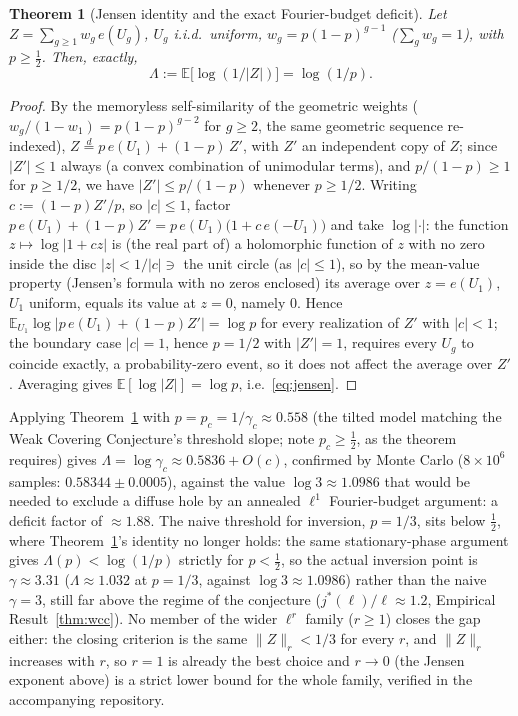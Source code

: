 \documentclass[11pt]{article}
\newtheorem{theorem}{Theorem}[section]
\theoremstyle{definition}
\theoremstyle{remark}
\begin{document}
\begin{theorem}[Jensen identity and the exact Fourier-budget deficit]
\label{thm:jensen}
Let $Z=\sum_{g\ge1} w_g\, e(U_g)$, $U_g$ i.i.d.\ uniform, $w_g =
p(1-p)^{g-1}$ ($\sum_g w_g=1$), with $p\ge\tfrac12$. Then, exactly,
\begin{equation}\label{eq:jensen}
  \Lambda := \mathbb{E}\bigl[\log(1/|Z|)\bigr] = \log(1/p).
\end{equation}
\end{theorem}

\begin{proof}
By the memoryless self-similarity of the geometric weights
($w_g/(1-w_1)=p(1-p)^{g-2}$ for $g\ge2$, the same geometric sequence
re-indexed), $Z \overset{d}{=} p\, e(U_1) + (1-p)\, Z'$, with $Z'$ an
independent copy of $Z$; since $|Z'|\le 1$ always (a convex combination
of unimodular terms), and $p/(1-p)\ge 1$ for $p\ge1/2$, we have
$|Z'|\le p/(1-p)$ whenever $p\ge1/2$. Writing $c:=(1-p)Z'/p$, so
$|c|\le1$, factor $p\,e(U_1)+(1-p)Z' = p\,e(U_1)\bigl(1+c\,e(-U_1)\bigr)$
and take $\log|\cdot|$: the function $z\mapsto\log|1+cz|$ is (the real
part of) a holomorphic function of $z$ with no zero inside the disc
$|z|<1/|c|\ni$ the unit circle (as $|c|\le1$), so by the mean-value
property (Jensen's formula with no zeros enclosed) its average over
$z=e(U_1)$, $U_1$ uniform, equals its value at $z=0$, namely $0$.
Hence $\mathbb{E}_{U_1}\log|p\,e(U_1)+(1-p)Z'| = \log p$ for every
realization of $Z'$ with $|c|<1$; the boundary case $|c|=1$, hence
$p=1/2$ with $|Z'|=1$, requires every $U_g$ to coincide exactly, a
probability-zero event, so it does not affect the average over $Z'$.
Averaging gives $\mathbb{E}[\log|Z|]=\log p$, i.e.\ \eqref{eq:jensen}.
\end{proof}

Applying Theorem~\ref{thm:jensen} with $p=p_c=1/\gamma_c\approx0.558$
(the tilted model matching the Weak Covering Conjecture's threshold
slope; note $p_c\ge\tfrac12$, as the theorem requires) gives
$\Lambda = \log\gamma_c \approx 0.5836+O(c)$, confirmed by Monte Carlo
($8\times10^6$ samples: $0.58344\pm0.0005$), against the value
$\log 3\approx 1.0986$ that would be needed to exclude a diffuse hole
by an annealed $\ell^1$ Fourier-budget argument: a deficit factor of
$\approx 1.88$. The naive threshold for inversion, $p=1/3$, sits below
$\tfrac12$, where Theorem~\ref{thm:jensen}'s identity no longer holds:
the same stationary-phase argument gives $\Lambda(p)<\log(1/p)$ strictly
for $p<\tfrac12$, so the actual inversion point is $\gamma\approx3.31$
($\Lambda\approx1.032$ at $p=1/3$, against $\log3\approx1.0986$) rather
than the naive $\gamma=3$, still far above the regime of the conjecture
($j^\ast(\ell)/\ell\approx1.2$, Empirical Result~\ref{thm:wcc}). No
member of the wider $\ell^r$ family ($r\ge1$) closes the gap either:
the closing criterion is the same $\|Z\|_r<1/3$ for every $r$, and
$\|Z\|_r$ increases with $r$, so $r=1$ is already the best choice and
$r\to0$ (the Jensen exponent above) is a strict lower bound for the
whole family, verified in the accompanying repository.
\end{document}
